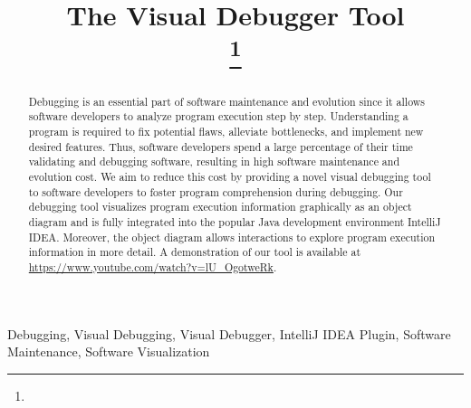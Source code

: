 \documentclass[conference]{IEEEtran}
\newcommand{\intellij}{IntelliJ IDEA}
\begin{document}
\title{The Visual Debugger Tool\\
{}
\thanks{}
}
\author{
}

\maketitle
\begin{abstract}
Debugging is an essential part of software maintenance and evolution since it allows software developers to analyze program execution step by step.
Understanding a program is required to fix potential flaws, alleviate bottlenecks, and implement new desired features.
Thus, software developers spend a large percentage of their time validating and debugging software, resulting in high software maintenance and evolution cost.
We aim to reduce this cost by providing a novel visual debugging tool to software developers to foster program comprehension during debugging.
Our debugging tool visualizes program execution information graphically as an object diagram and is fully integrated into the popular Java development environment \intellij{}.
Moreover, the object diagram allows interactions to explore program execution information in more detail.
A demonstration of our tool is available at \url{https://www.youtube.com/watch?v=lU_OgotweRk}.
\end{abstract}

\begin{IEEEkeywords}
Debugging, Visual Debugging, Visual Debugger, IntelliJ IDEA Plugin, Software Maintenance, Software Visualization
\end{IEEEkeywords}
\end{document}
